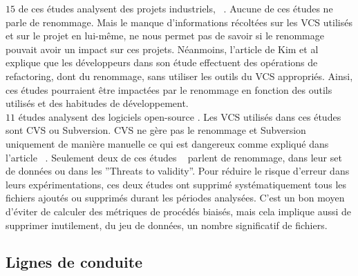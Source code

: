 $15$ de ces études analysent des projets industriels, ~\cite{arisholm_systematic_2010,graves_predicting_2000,khoshgoftaar_using_2000,layman_iterative_2008,munson_code_1998,nagappan_use_2005,nagappan_influence_2008,nagappan_using_2007,nagappan_using_2006,nagappan_change_2010,nikora_building_2006,ostrand_programmer-based_2010,weyuker_too_2008,weyuker_using_2007,yuan_application_2000}. Aucune de ces études ne parle de renommage. Mais le manque d'informations récoltées sur les VCS utilisés et sur le projet en lui-même, ne nous permet pas de savoir si le renommage pouvait avoir un impact sur ces projets. Néanmoins, l'article de Kim et al ~\cite{kim_field_2012} explique que les développeurs dans son étude effectuent des opérations de refactoring, dont du renommage, sans utiliser les outils du VCS appropriés. Ainsi, ces études pourraient être impactées par le renommage en fonction des outils utilisés et des habitudes de développement.\\

$11$ études analysent des logiciels open-source \cite{dambros_relationship_2009,bacchelli_are_2010,caglayan_merits_2009,dambros_evaluating_2012,dambros_evaluating_2012,dambros_extensive_2010,illes-seifert_exploring_2010,li_finding_2005,matsumoto_analysis_2010,moser_analysis_2008,moser_comparative_2008,schroter_if_2006}. Les VCS utilisés dans ces études sont CVS ou Subversion. CVS ne gère pas le renommage et Subversion uniquement de manière manuelle ce qui est dangereux comme expliqué dans l'article ~\cite{lavoie_inferring_2012,steidl_incremental_2014}. Seulement deux de ces études ~\cite{moser_analysis_2008,moser_comparative_2008} parlent de renommage, dans leur set de données ou dans les ''Threats to validity''. Pour réduire le risque d'erreur dans leurs expérimentations, ces deux études ont supprimé systématiquement tous les fichiers ajoutés ou supprimés durant les périodes analysées. C'est un bon moyen d'éviter de calculer des métriques de procédés biaisés, mais cela implique aussi de supprimer inutilement, du jeu de données, un nombre significatif de fichiers.\\

\subsection{Lignes de conduite}
\label{sec:guidelines}

